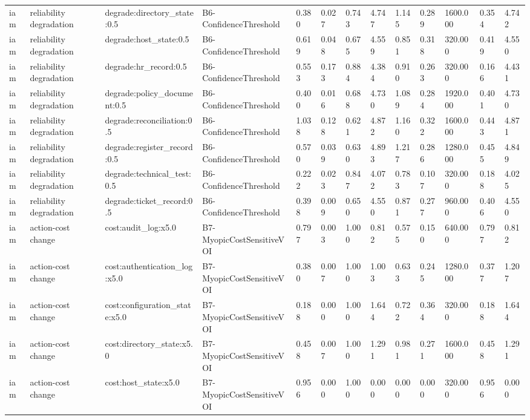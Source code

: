 \begin{table}[!ht]
{\begin{tabular}{lllllllllllll}
iam & reliability degradation & degrade:directory\_state:0.5 & B6-ConfidenceThreshold & 0.380 & 0.027 & 0.743 & 4.747 & 1.145 & 0.289 & 1600.000 & 0.354 & 4.742 \\
iam & reliability degradation & degrade:host\_state:0.5 & B6-ConfidenceThreshold & 0.619 & 0.048 & 0.675 & 4.559 & 0.851 & 0.318 & 320.000 & 0.419 & 4.550 \\
iam & reliability degradation & degrade:hr\_record:0.5 & B6-ConfidenceThreshold & 0.553 & 0.173 & 0.884 & 4.384 & 0.910 & 0.263 & 320.000 & 0.166 & 4.431 \\
iam & reliability degradation & degrade:policy\_document:0.5 & B6-ConfidenceThreshold & 0.400 & 0.016 & 0.688 & 4.730 & 1.089 & 0.284 & 1920.000 & 0.401 & 4.730 \\
iam & reliability degradation & degrade:reconciliation:0.5 & B6-ConfidenceThreshold & 1.038 & 0.128 & 0.621 & 4.872 & 1.160 & 0.322 & 1600.000 & 0.443 & 4.871 \\
iam & reliability degradation & degrade:register\_record:0.5 & B6-ConfidenceThreshold & 0.570 & 0.039 & 0.630 & 4.893 & 1.217 & 0.286 & 1280.000 & 0.455 & 4.849 \\
iam & reliability degradation & degrade:technical\_test:0.5 & B6-ConfidenceThreshold & 0.222 & 0.023 & 0.847 & 4.072 & 0.783 & 0.107 & 320.000 & 0.188 & 4.025 \\
iam & reliability degradation & degrade:ticket\_record:0.5 & B6-ConfidenceThreshold & 0.398 & 0.009 & 0.650 & 4.550 & 0.871 & 0.277 & 960.000 & 0.406 & 4.550 \\
iam & action-cost change & cost:audit\_log:x5.0 & B7-MyopicCostSensitiveVOI & 0.797 & 0.003 & 1.000 & 0.812 & 0.575 & 0.150 & 640.000 & 0.797 & 0.812 \\
iam & action-cost change & cost:authentication\_log:x5.0 & B7-MyopicCostSensitiveVOI & 0.380 & 0.007 & 1.000 & 1.003 & 0.633 & 0.245 & 1280.000 & 0.377 & 1.207 \\
iam & action-cost change & cost:configuration\_state:x5.0 & B7-MyopicCostSensitiveVOI & 0.188 & 0.000 & 1.000 & 1.644 & 0.722 & 0.364 & 320.000 & 0.188 & 1.644 \\
iam & action-cost change & cost:directory\_state:x5.0 & B7-MyopicCostSensitiveVOI & 0.458 & 0.007 & 1.000 & 1.291 & 0.981 & 0.271 & 1600.000 & 0.458 & 1.291 \\
iam & action-cost change & cost:host\_state:x5.0 & B7-MyopicCostSensitiveVOI & 0.956 & 0.000 & 1.000 & 0.000 & 0.000 & 0.000 & 320.000 & 0.956 & 0.000 \\

\end{tabular}}
\end{table}
